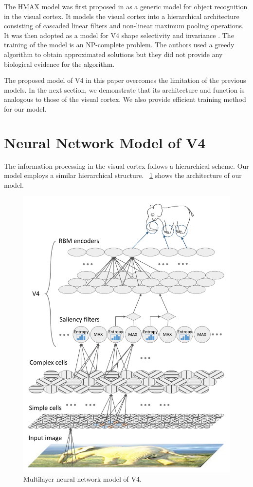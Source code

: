 \documentclass[conference]{IEEEtran}
\begin{document}
The HMAX model was first proposed in \cite{riesenhuber1999}
as a generic model for object recognition in the visual cortex.
It models the visual cortex into a hierarchical architecture 
consisting of cascaded linear filters and non-linear maximum pooling operations.
It was then adopted as a model for V4 shape selectivity and invariance \cite{cadieu2007}.
The training of the model is an NP-complete problem. 
The authors used a greedy algorithm to obtain approximated solutions
but they did not provide any biological evidence for the algorithm. 

The proposed model of V4 in this paper overcomes the limitation of the previous models.
In the next section, we demonstrate that its architecture and function is analogous 
to those of the visual cortex.
We also provide efficient training method for our model.


\section{Neural Network Model of V4}
\label{sec:3}

The information processing in the visual cortex follows a hierarchical scheme.
Our model employs a similar hierarchical structure.
\figurename~\ref{fig:3} shows the architecture of our model.

\begin{figure}[htp]
\centerline{\includegraphics[width=0.99\linewidth]{images/fig3.pdf}} 
\caption{Multilayer neural network model of V4.}
\label{fig:3}
\end{figure}
\end{document}
